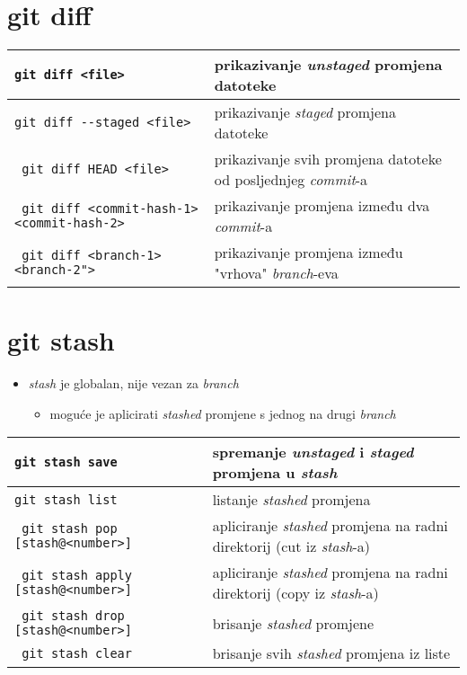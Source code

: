 \documentclass[10pt]{article}
\begin{document}
    \section*{git diff}
    \begin{tabular}{|>{\tt}p{9.00cm}|>{}p{15.50cm}|}
        \hline
        git diff <file>                             & prikazivanje \textit{unstaged} promjena datoteke \\ \hline
        git diff -{}-staged <file>                    & prikazivanje \textit{staged} promjena datoteke \\ \hline
        git diff HEAD <file>                        & prikazivanje svih promjena datoteke od posljednjeg \textit{commit}-a \\ \hline
        git diff <commit-hash-1> <commit-hash-2>    & prikazivanje promjena između dva \textit{commit}-a \\ \hline
        git diff <branch-1> <branch-2">             & prikazivanje promjena između "vrhova" \textit{branch}-eva \\ \hline
    \end{tabular}

    \section*{git stash}
    \begin{itemize}
        \item \textit{stash} je globalan, nije vezan za \textit{branch}
        \begin{itemize}
            \item moguće je aplicirati \textit{stashed} promjene s jednog na drugi \textit{branch}
        \end{itemize}
    \end{itemize}
    \begin{tabular}{|>{\tt}p{9.00cm}|>{}p{15.50cm}|}
        \hline
        git stash save                                  & spremanje \textit{unstaged} i \textit{staged} promjena u \textit{stash} \\ \hline
        git stash list                                  & listanje \textit{stashed} promjena \\ \hline
        git stash pop [stash@{<number>}]                       & apliciranje \textit{stashed} promjena na radni direktorij (cut iz \textit{stash}-a) \\ \hline
        git stash apply [stash@{<number>}]                     & apliciranje \textit{stashed} promjena na radni direktorij (copy iz \textit{stash}-a) \\ \hline
        git stash drop [stash@{<number>}]                      & brisanje \textit{stashed} promjene \\ \hline
        git stash clear                                 & brisanje svih \textit{stashed} promjena iz liste \\ \hline
    \end{tabular}
\end{document}
